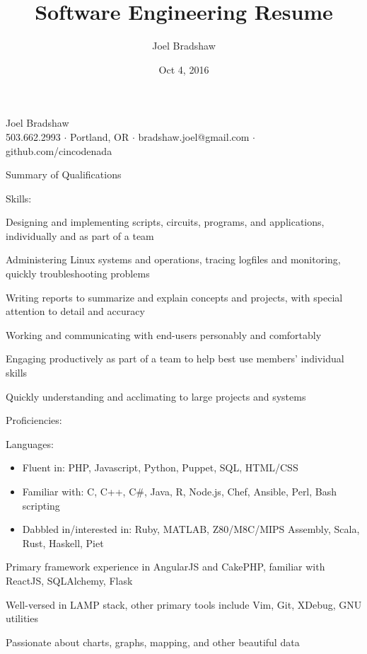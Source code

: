 \documentclass[letterpaper,10pt]{article}
\begin{document}
\title{Software Engineering Resume}
\author{Joel Bradshaw}
\date{Oct 4, 2016}
\begin{center}
{\Huge Joel Bradshaw}\\
\vskip 2pt
{\large 503.662.2993 \ensuremath{\cdot} Portland, OR \ensuremath{\cdot} bradshaw.joel@gmail.com \ensuremath{\cdot} github.com/cincodenada}
\end{center}
\vskip -8pt
\begin{res_section}{Summary of Qualifications}
\begin{res_subsection}{Skills:}
  \item Designing and implementing scripts, circuits, programs, and applications, individually and as part of a team
  \item Administering Linux systems and operations, tracing logfiles and monitoring, quickly troubleshooting problems
  \item Writing reports to summarize and explain concepts and projects, with special attention to detail and accuracy
  \item Working and communicating with end-users personably and comfortably
  \item Engaging productively as part of a team to help best use members' individual skills
  \item Quickly understanding and acclimating to large projects and systems
\end{res_subsection}
\begin{res_subsection}{Proficiencies:}
  \item Languages:
  \def \multicolsep {0pt}
  \setlength{\columnsep}{-8pt}
  \begin{itemize}
    \item Fluent in: PHP, Javascript, Python, Puppet, SQL, HTML/CSS
    \item Familiar with: C, C++, C\#, Java, R, Node.js, Chef, Ansible, Perl, Bash scripting
    \item Dabbled in/interested in: Ruby, MATLAB, Z80/M8C/MIPS Assembly, Scala, Rust, Haskell, Piet
  \end{itemize}
  \item Primary framework experience in AngularJS and CakePHP, familiar with ReactJS, SQLAlchemy, Flask
  \item Well-versed in LAMP stack, other primary tools include Vim, Git, XDebug, GNU utilities
  \item Passionate about charts, graphs, mapping, and other beautiful data
\end{res_subsection}
\end{res_section}
\end{document}
